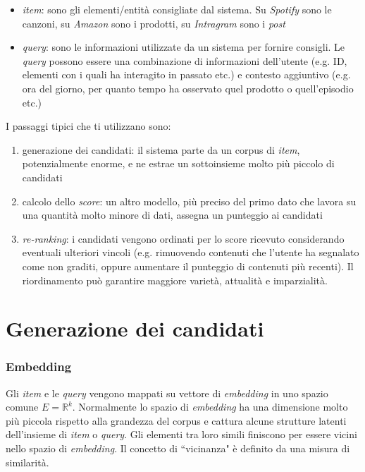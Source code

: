 \begin{itemize}
    \item \textit{item}: sono gli elementi/entità consigliate dal sistema. Su \textit{Spotify} sono le canzoni, su \textit{Amazon} sono i prodotti, su \textit{Intragram} sono i \textit{post}
    \item \textit{query}: sono le informazioni utilizzate da un sistema per fornire consigli. Le \textit{query} possono essere una combinazione di informazioni dell'utente (e.g. ID, elementi con i quali ha interagito in passato etc.) e contesto aggiuntivo (e.g. ora del giorno, per quanto tempo ha osservato quel prodotto o quell'episodio etc.)
\end{itemize}

I passaggi tipici che ti utilizzano sono: 

\begin{enumerate}
    \item generazione dei candidati: il sistema parte da un corpus di \textit{item}, potenzialmente enorme, e ne estrae un sottoinsieme molto più piccolo di candidati
    \item calcolo dello \textit{score}: un altro modello, più preciso del primo dato che lavora su una quantità molto minore di dati, assegna un punteggio ai candidati
    \item \textit{re-ranking}: i candidati vengono ordinati per lo score ricevuto considerando eventuali ulteriori vincoli (e.g. rimuovendo contenuti che l'utente ha segnalato come non graditi, oppure aumentare il punteggio di contenuti più recenti). Il riordinamento può garantire maggiore varietà, attualità e imparzialità.
\end{enumerate}

\section{Generazione dei candidati}\label{generazione_dei_candidati}

\subsubsection{Embedding}

Gli \textit{item} e le \textit{query} vengono mappati su  vettore di \textit{embedding} in uno spazio comune $E = \mathbb{R}^k$. Normalmente lo spazio di \textit{embedding} ha una dimensione molto più piccola rispetto alla grandezza del corpus e cattura alcune strutture latenti dell'insieme di \textit{item} o \textit{query}. Gli elementi tra loro simili finiscono per essere vicini nello spazio di \textit{embedding}. Il concetto di ``vicinanza" è definito da una misura di similarità.
 
